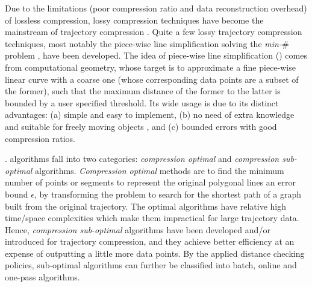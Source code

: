 Due to the  limitations (poor compression ratio and data reconstruction overhead) of lossless compression, lossy compression techniques have become the mainstream of trajectory compression \cite{Lin:Operb,Zhang:Evaluation}. Quite a few lossy trajectory compression techniques, most notably the piece-wise line simplification \cite{Douglas:Peucker, Hershberger:Speeding, Keogh:online,Liu:BQS, Muckell:Compression, Chen:Trajectory, Chen:Fast, Cao:Spatio, Shi:Survey} solving the \emph{min-$\#$} problem \cite{Chan:Optimal, Imai:Optimal,Pavlidis:Segment}, have been developed. The idea of piece-wise line simplification (\lsa) comes from computational geometry, whose target is to approximate a fine piece-wise linear curve with a coarse one (whose corresponding data points are a subset of the former), such that the maximum distance of the former to the latter is bounded by a user specified threshold. Its wide usage is due to its distinct advantages: (a) simple and easy to implement, (b) no need of extra knowledge and suitable for freely  moving  objects \cite{Popa:Spatio}, and (c) bounded errors with good compression ratios.

%


. \lsa algorithms fall into two categories: \textit{compression optimal} and \textit{compression sub-optimal} algorithms.
\textit{Compression optimal} methods\cite{Imai:Optimal,Chan:Optimal} are to find the minimum number of points or segments to represent the original polygonal lines \wrt an error bound $\epsilon$, by transforming the problem to search for the shortest path of a graph built from the original trajectory.
The optimal \lsa algorithms have relative high time/space complexities which make them impractical for large trajectory data.
Hence, \textit{compression sub-optimal} \lsa algorithms have been developed and/or introduced for trajectory compression, and they achieve better efficiency at an expense of outputting a little more data points. By the applied distance checking policies, sub-optimal algorithms can further be classified into batch, online and one-pass algorithms.

